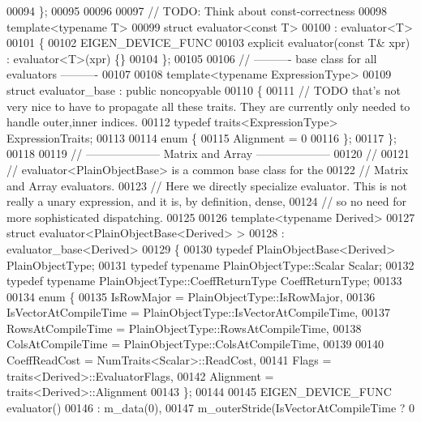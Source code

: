 \begin{DoxyCode}
00094 \};
00095 
00096 
00097 \textcolor{comment}{// TODO: Think about const-correctness}
00098 \textcolor{keyword}{template}<\textcolor{keyword}{typename} T>
00099 \textcolor{keyword}{struct }evaluator<const T>
00100   : evaluator<T>
00101 \{
00102   EIGEN\_DEVICE\_FUNC
00103   \textcolor{keyword}{explicit} evaluator(\textcolor{keyword}{const} T& xpr) : evaluator<T>(xpr) \{\}
00104 \};
00105 
00106 \textcolor{comment}{// ---------- base class for all evaluators ----------}
00107 
00108 \textcolor{keyword}{template}<\textcolor{keyword}{typename} ExpressionType>
00109 \textcolor{keyword}{struct }evaluator\_base : \textcolor{keyword}{public} noncopyable
00110 \{
00111   \textcolor{comment}{// TODO that's not very nice to have to propagate all these traits. They are currently only needed to
       handle outer,inner indices.}
00112   \textcolor{keyword}{typedef} traits<ExpressionType> ExpressionTraits;
00113   
00114   \textcolor{keyword}{enum} \{
00115     Alignment = 0
00116   \};
00117 \};
00118 
00119 \textcolor{comment}{// -------------------- Matrix and Array --------------------}
00120 \textcolor{comment}{//}
00121 \textcolor{comment}{// evaluator<PlainObjectBase> is a common base class for the}
00122 \textcolor{comment}{// Matrix and Array evaluators.}
00123 \textcolor{comment}{// Here we directly specialize evaluator. This is not really a unary expression, and it is, by definition,
       dense,}
00124 \textcolor{comment}{// so no need for more sophisticated dispatching.}
00125 
00126 \textcolor{keyword}{template}<\textcolor{keyword}{typename} Derived>
00127 \textcolor{keyword}{struct }evaluator<PlainObjectBase<Derived> >
00128   : evaluator\_base<Derived>
00129 \{
00130   \textcolor{keyword}{typedef} PlainObjectBase<Derived> PlainObjectType;
00131   \textcolor{keyword}{typedef} \textcolor{keyword}{typename} PlainObjectType::Scalar Scalar;
00132   \textcolor{keyword}{typedef} \textcolor{keyword}{typename} PlainObjectType::CoeffReturnType CoeffReturnType;
00133 
00134   \textcolor{keyword}{enum} \{
00135     IsRowMajor = PlainObjectType::IsRowMajor,
00136     IsVectorAtCompileTime = PlainObjectType::IsVectorAtCompileTime,
00137     RowsAtCompileTime = PlainObjectType::RowsAtCompileTime,
00138     ColsAtCompileTime = PlainObjectType::ColsAtCompileTime,
00139     
00140     CoeffReadCost = NumTraits<Scalar>::ReadCost,
00141     Flags = traits<Derived>::EvaluatorFlags,
00142     Alignment = traits<Derived>::Alignment
00143   \};
00144   
00145   EIGEN\_DEVICE\_FUNC evaluator()
00146     : m\_data(0),
00147       m\_outerStride(IsVectorAtCompileTime  ? 0 

\end{DoxyCode}
